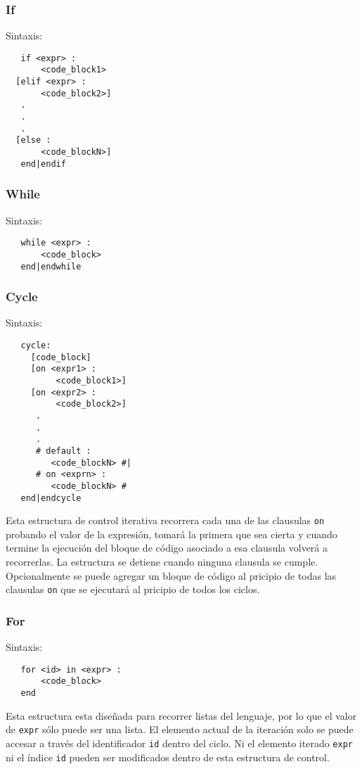 \documentclass[12pt, spanish]{report}
\begin{document}
\subsubsection{If}
Sintaxis:
\begin{verbatim}
   if <expr> :
       <code_block1>
  [elif <expr> :
       <code_block2>]
   .
   .
   .
  [else :
       <code_blockN>]
   end|endif
\end{verbatim}

\subsubsection{While}
Sintaxis:
\begin{verbatim}
   while <expr> :
       <code_block>
   end|endwhile
\end{verbatim}

\subsubsection{Cycle}
Sintaxis:
\begin{verbatim}
   cycle:
     [code_block]
     [on <expr1> :
          <code_block1>]
     [on <expr2> :
          <code_block2>]
      .
      .
      .
      # default :
         <code_blockN> #|
      # on <exprn> : 
         <code_blockN> #
   end|endcycle
\end{verbatim}
Esta estructura de control iterativa recorrera cada una de las clausulas
\texttt{on} probando el valor de la expresi\'on, tomar\'a la primera que sea cierta
y cuando termine la ejecuci\'on del bloque de c\'odigo asociado a esa
clausula volver\'a a recorrerlas. La estructura se detiene cuando ninguna
clausula se cumple. Opcionalmente se puede agregar un bloque de c\'odigo
al pricipio de todas las clausulas \texttt{on} que se ejecutar\'a al
pricipio de todos los ciclos.


\subsubsection{For}
Sintaxis:
\begin{verbatim}
   for <id> in <expr> :
       <code_block>
   end
\end{verbatim}

Esta estructura esta dise\~nada para recorrer listas del lenguaje, 
por lo que el valor de \texttt{expr} s\'olo puede ser una lista. 
El elemento actual de la iteraci\'on solo se puede accesar a trav\'es 
del identificador \texttt{id} dentro del ciclo. Ni el elemento iterado 
\texttt{expr} ni el \'indice \texttt{id} pueden ser modificados dentro
de esta estructura de control.\\
\end{document}
